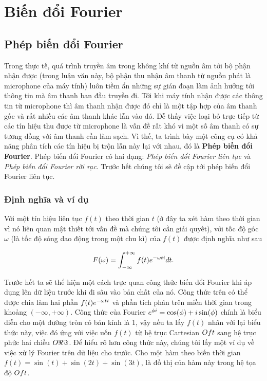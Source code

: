 \newcommand{\fourierimg}[1]{parts/appendix/img/#1}
\setupfont{13pt}

\appendix

\chapter{Biến đổi Fourier}

\section{Phép biến đổi Fourier}
	
	 Trong thực tế, quá trình truyền âm trong không khí từ nguồn âm tới bộ phận nhận được (trong luận văn này, bộ phận thu nhận âm thanh từ nguồn phát là microphone của máy tính) luôn tiềm ẩn những sự gián đoạn làm ảnh hưởng tới thông tin mà âm thanh ban đầu truyền đi. Tới khi máy tính nhận được các thông tin từ microphone thì âm thanh nhận được đó chỉ là một tập hợp của âm thanh gốc và rất nhiều các âm thanh khác lẫn vào đó. Dễ thấy việc loại bỏ trực tiếp từ các tín hiệu thu được từ microphone là vấn đề rất khó vì một số âm thanh có sự tương đồng với âm thanh cần làm sạch. Vì thế, ta trình bày một công cụ có khả năng phân tích các tín hiệu bị trộn lẫn này lại với nhau, đó là \textbf{Phép biến đổi Fourier}. Phép biến đổi Fourier có hai dạng: \textit{Phép biến đổi Fourier liên tục} và \textit{Phép biến đổi Fourier rời rạc}. Trước hết chúng tôi sẽ đề cập tới phép biến đổi Fourier liên tục.

	\subsection{Định nghĩa và ví dụ}
	
		Với một tín hiệu liên tục $f(t)$ theo thời gian $t$ (ở đây ta xét hàm theo thời gian vì nó liên quan mật thiết tới vấn đề mà chúng tôi cần giải quyết),  với tốc độ góc $\omega$ (là tốc độ sóng dao động trong một chu kì) của $f(t)$ được định nghĩa như sau
		
			\begin{equation}
				F(\omega) = \int_{-\infty}^{+\infty}f(t)e^{-\omega ti}dt.
			\label{appendix::fourier::forward_formula}
			\end{equation}
		
		Trước hết ta sẽ thể hiện một cách trực quan công thức biến đổi Fourier khi áp dụng lên dữ liệu trước khi đi sâu vào bản chất của nó. Công thức trên có thể được chia làm hai phần $f(t)e^{-\omega ti}$ và phần tích phân trên miền thời gian trong khoảng $(-\infty, +\infty)$. Công thức của Fourier $e^{\phi i} = \cos(\phi) + i\sin(\phi)$ chính là biểu diễn cho một đường tròn có bán kính là 1, vậy nếu ta lấy $f(t)$ nhân với lại biểu thức này, việc đó ứng với việc uốn $f(t)$ từ hệ trục Cartesian $Oft$ sang hệ trục phức hai chiều $O \Re \Im$. Để hiểu rõ hơn công thức này, chúng tôi lấy một ví dụ về việc xử lý Fourier trên dữ liệu cho trước. Cho một hàm theo biến thời gian $f(t) = \sin(t) + \sin(2t) + \sin(3t)$,  là đồ thị của hàm này trong hệ tọa độ $Oft$.
		
